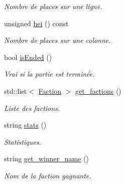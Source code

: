 \begin{DoxyCompactItemize}
\begin{DoxyCompactList}\small\item\em Nombre de places sur une ligne. \end{DoxyCompactList}\item 
\hypertarget{classWorld_abb70914eb0c8c9a083372c679b512a84}{unsigned \hyperlink{classWorld_abb70914eb0c8c9a083372c679b512a84}{hei} () const }\label{classWorld_abb70914eb0c8c9a083372c679b512a84}

\begin{DoxyCompactList}\small\item\em Nombre de places sur une colonne. \end{DoxyCompactList}\item 
\hypertarget{classWorld_ae8473fc069907cd6cc96d32c49b62d7e}{bool \hyperlink{classWorld_ae8473fc069907cd6cc96d32c49b62d7e}{is\-Ended} ()}\label{classWorld_ae8473fc069907cd6cc96d32c49b62d7e}

\begin{DoxyCompactList}\small\item\em Vrai si la partie est terminée. \end{DoxyCompactList}\item 
std\-::list$<$ \hyperlink{classFaction}{Faction} $>$ \hyperlink{classWorld_afcbc72644f2fc56f223c9bb80b50474a}{get\-\_\-factions} ()
\begin{DoxyCompactList}\small\item\em Liste des factions. \end{DoxyCompactList}\item 
string \hyperlink{classWorld_a2ae945389cb96c6a10dcc07a45a2cefd}{stats} ()
\begin{DoxyCompactList}\small\item\em Statistiques. \end{DoxyCompactList}\item 
string \hyperlink{classWorld_aaa59a538a6b688f164707743faf63072}{get\-\_\-winner\-\_\-name} ()
\begin{DoxyCompactList}\small\item\em Nom de la faction gagnante. \end{DoxyCompactList}\end{DoxyCompactItemize}
